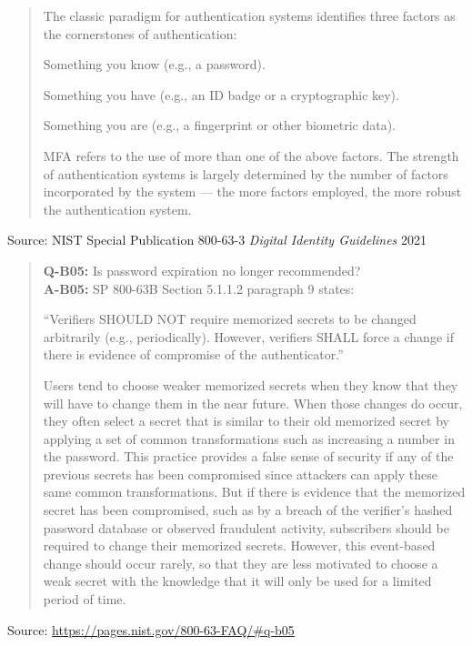 \documentclass[Screen16to9,17pt]{foils}
\begin{document}


\begin{quote}
The classic paradigm for authentication systems identifies three factors as the cornerstones of
authentication:
\begin{list2}
\item Something you know (e.g., a password).
\item Something you have (e.g., an ID badge or a cryptographic key).
\item Something you are (e.g., a fingerprint or other biometric data).
\end{list2}
MFA refers to the use of more than one of the above factors. The strength of authentication
systems is largely determined by the number of factors incorporated by the system — the more
factors employed, the more robust the authentication system.
\end{quote}
Source: NIST Special Publication 800-63-3 \emph{Digital Identity Guidelines} 2021




\begin{quote}
{\bf Q-B05:} Is password expiration no longer recommended?\\
{\bf A-B05:} SP 800-63B Section 5.1.1.2 paragraph 9 states:

“Verifiers SHOULD NOT require memorized secrets to be changed arbitrarily (e.g., periodically). However, verifiers SHALL force a change if there is evidence of compromise of the authenticator.”

{\footnotesize Users tend to choose weaker memorized secrets when they know that they will have to change them in the near future. When those changes do occur, they often select a secret that is similar to their old memorized secret by applying a set of common transformations such as increasing a number in the password. This practice provides a false sense of security if any of the previous secrets has been compromised since attackers can apply these same common transformations. But if there is evidence that the memorized secret has been compromised, such as by a breach of the verifier’s hashed password database or observed fraudulent activity, subscribers should be required to change their memorized secrets. However, this event-based change should occur rarely, so that they are less motivated to choose a weak secret with the knowledge that it will only be used for a limited period of time.}
\end{quote}
Source: \url{https://pages.nist.gov/800-63-FAQ/#q-b05}
\end{document}
